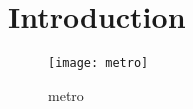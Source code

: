 \documentclass[12pt,]{article}
\begin{document}
\listoffigures
\section{Introduction}

\begin{wrapfigure}{r}{0.5\textwidth}
  \vspace{-20pt}
  \begin{center}
    \texttt{[image: metro]}
  \end{center}
  \vspace{-20pt}
  \caption{metro}
  \vspace{-10pt}
\end{wrapfigure}
\end{document}
